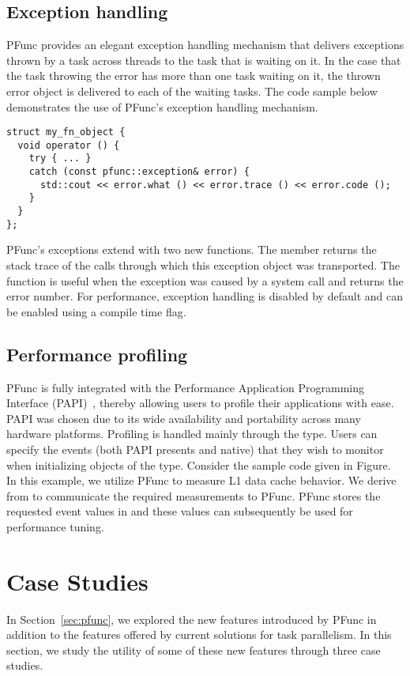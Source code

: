 \documentclass{sig-alternate}
\begin{document}
\subsection{Exception handling}
\label{sec:exceptions}
PFunc provides an elegant exception handling mechanism that delivers exceptions
thrown by a task across threads to the task that is waiting on it. In the case
that the task throwing the error has more than one task waiting on it, the
thrown error object is delivered to each of the waiting tasks. The code sample
below demonstrates the use of PFunc's exception handling mechanism.

\begin{lstlisting}
struct my_fn_object { 
  void operator () { 
    try { ... }
    catch (const pfunc::exception& error) { 
      std::cout << error.what () << error.trace () << error.code (); 
    } 
  }
};
\end{lstlisting}

PFunc's exceptions extend  with two new functions. The
member  returns the stack trace of the calls through
which this exception object was transported. The function
 is useful when the exception was caused by a system call
and returns the error number.  For performance, exception handling is
disabled by default and can be enabled using a compile time flag. 

\subsection{Performance profiling}
\label{sec:performance}
PFunc is fully integrated with the Performance Application Programming
Interface (PAPI)~\cite{papi}, thereby allowing users to profile their
applications with ease. PAPI was chosen due to its wide availability and
portability across many hardware platforms. Profiling is handled mainly through
the  type. Users can specify the events (both PAPI presents and
native) that they wish to monitor when initializing objects of the
 type. Consider the sample code given in Figure.
In this example, we utilize PFunc to measure L1 data cache behavior. We
derive from  to communicate the required
measurements to PFunc. PFunc stores the requested event values in
 and these values can subsequently be used for performance
tuning.

\section{Case Studies}
\label{sec:cases}
In Section~\ref{sec:pfunc}, we explored the new features introduced by PFunc in
addition to the features offered by current solutions for task parallelism. In
this section, we study the utility of some of these new features through three
case studies.
\end{document}
